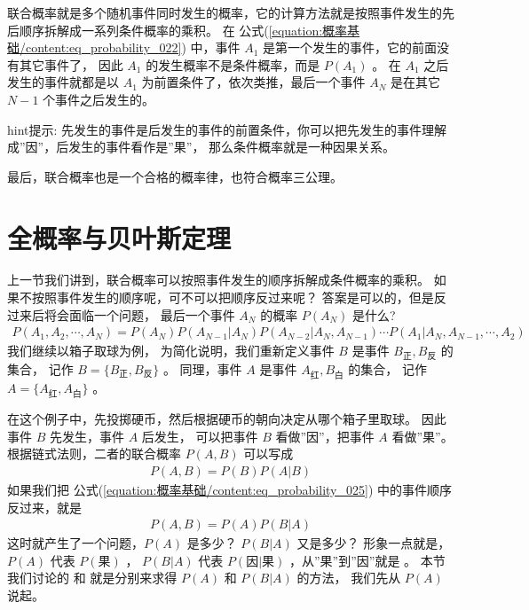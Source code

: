 \documentclass[letterpaper,10pt,english]{sphinxmanual}
\begin{document}
联合概率就是多个随机事件同时发生的概率，它的计算方法就是按照事件发生的先后顺序拆解成一系列条件概率的乘积。
在 公式(\ref{equation:概率基础/content:eq_probability_022}) 中，事件 \(A_1\) 是第一个发生的事件，它的前面没有其它事件了，
因此 \(A_1\) 的发生概率不是条件概率，而是 \(P(A_1)\) 。
在 \(A_1\) 之后发生的事件就都是以 \(A_1\) 为前置条件了，依次类推，最后一个事件 \(A_N\)
是在其它 \(N-1\) 个事件之后发生的。

\begin{sphinxadmonition}{hint}{提示:}
先发生的事件是后发生的事件的前置条件，你可以把先发生的事件理解成”因”，后发生的事件看作是”果”，
那么条件概率就是一种因果关系。
\end{sphinxadmonition}

最后，联合概率也是一个合格的概率律，也符合概率三公理。


\section{全概率与贝叶斯定理}
\label{\detokenize{_u6982_u7387_u57fa_u7840/content:id8}}
上一节我们讲到，联合概率可以按照事件发生的顺序拆解成条件概率的乘积。
如果不按照事件发生的顺序呢，可不可以把顺序反过来呢？
答案是可以的，但是反过来后将会面临一个问题，
最后一个事件 \(A_N\) 的概率 \(P(A_N)\) 是什么?
\begin{equation}\label{equation:概率基础/content:概率基础/content:16}
\begin{split}P(A_1,A_2,\cdots,A_N) = P(A_N)P(A_{N-1}|A_N)P(A_{N-2}|A_N,A_{N-1}) \cdots P(A_1|A_N,A_{N-1},\cdots,A_2)\end{split}
\end{equation}
我们继续以箱子取球为例，
为简化说明，我们重新定义事件 \(B\) 是事件 \(B_{\text{正}},B_{\text{反}}\) 的集合，
记作 \(B=\{B_{\text{正}},B_{\text{反}}\}\) 。
同理，事件 \(A\) 是事件 \(A_{\text{红}},B_{\text{白}}\) 的集合，
记作 \(A=\{A_{\text{红}},A_{\text{白}}\}\) 。

在这个例子中，先投掷硬币，然后根据硬币的朝向决定从哪个箱子里取球。
因此事件 \(B\) 先发生，事件 \(A\) 后发生，
可以把事件 \(B\) 看做”因”，把事件 \(A\) 看做”果”。
根据链式法则，二者的联合概率 \(P(A,B)\) 可以写成
\begin{equation}\label{equation:概率基础/content:eq_probability_025}
\begin{split}P(A,B) = P(B)P(A|B)\end{split}
\end{equation}
如果我们把 公式(\ref{equation:概率基础/content:eq_probability_025}) 中的事件顺序反过来，就是
\begin{equation}\label{equation:概率基础/content:eq_probability_026}
\begin{split}P(A,B) = P(A)P(B|A)\end{split}
\end{equation}
这时就产生了一个问题，\(P(A)\) 是多少？ \(P(B|A)\) 又是多少？
形象一点就是， \(P(A)\) 代表 \(P(\text{果})\) ，
\(P(B|A)\) 代表 \(P(因|果)\) ，从”果”到”因”就是  。
本节我们讨论的  和  就是分别来求得
\(P(A)\) 和  \(P(B|A)\) 的方法，
我们先从 \(P(A)\) 说起。
\end{document}
